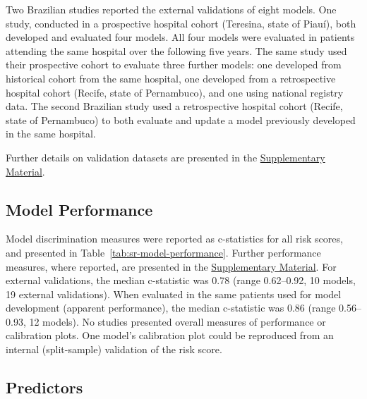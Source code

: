 Two Brazilian studies reported the external validations of eight models\cite{foinquinosTemporalValidationPredictive2021,costaPredictingDeathKalaazar2016}. One study, conducted in a prospective hospital cohort (Teresina, state of Piauí), both developed and evaluated four models. All four models were evaluated in patients attending the same hospital over the following five years\cite{costaPredictingDeathKalaazar2016}. The same study used their prospective cohort to evaluate three further models: one developed from historical cohort from the same hospital\cite{werneckPrognosticFactorsDeath2003}, one developed from a retrospective hospital cohort (Recife, state of Pernambuco)\cite{sampaioRiskFactorsDeath2010}, and one using national registry data\cite{coura-vitalPrognosticFactorsScoring2014}. The second Brazilian study\cite{foinquinosTemporalValidationPredictive2021} used a retrospective hospital cohort (Recife, state of Pernambuco) to both evaluate and update a model previously developed in the same hospital\cite{sampaioRiskFactorsDeath2010}.

Further details on validation datasets are presented in the \href{https://github.com/jpwil/dphil}{Supplementary Material}.

\subsection{Model Performance}

Model discrimination measures were reported as c-statistics for all risk scores, and presented in Table~\ref{tab:sr-model-performance}. Further performance measures, where reported, are presented in the \href{https://github.com/jpwil/dphil}{Supplementary Material}. For external validations, the median c-statistic was 0.78 (range 0.62--0.92, 10 models, 19 external validations). When evaluated in the same patients used for model development (apparent performance), the median c-statistic was 0.86 (range 0.56--0.93, 12 models). No studies presented overall measures of performance or calibration plots. One model's calibration plot could be reproduced from an internal (split-sample) validation of the risk score\cite{coura-vitalPrognosticFactorsScoring2014}.



\subsection{Predictors}

